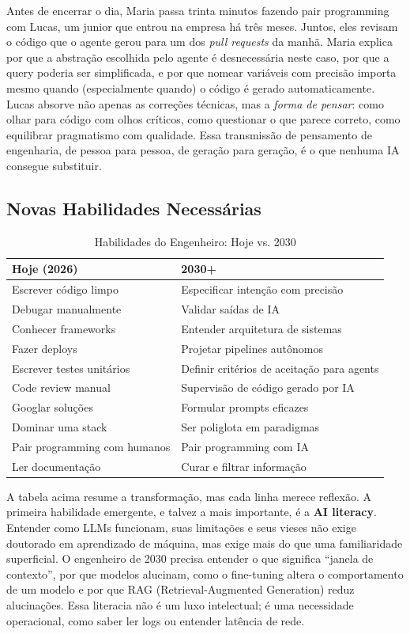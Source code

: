 Antes de encerrar o dia, Maria passa trinta minutos fazendo pair
programming com Lucas, um junior que entrou na empresa há três meses.
Juntos, eles revisam o código que o agente gerou para um dos
\textit{pull requests} da manhã. Maria explica por que a abstração
escolhida pelo agente é desnecessária neste caso, por que a query
poderia ser simplificada, e por que nomear variáveis com precisão
importa mesmo quando (especialmente quando) o código é gerado
automaticamente. Lucas absorve não apenas as correções técnicas, mas
a \textit{forma de pensar}: como olhar para código com olhos críticos,
como questionar o que parece correto, como equilibrar pragmatismo com
qualidade. Essa transmissão de pensamento de engenharia, de pessoa
para pessoa, de geração para geração, é o que nenhuma IA consegue
substituir.

\subsection{Novas Habilidades Necessárias}

\begin{table}[h]
\centering
\caption{Habilidades do Engenheiro: Hoje vs. 2030}
\begin{tabular}{p{5.5cm} p{5.5cm}}
\toprule
\textbf{Hoje (2026)} & \textbf{2030+} \\
\midrule
Escrever código limpo & Especificar intenção com precisão \\
Debugar manualmente & Validar saídas de IA \\
Conhecer frameworks & Entender arquitetura de sistemas \\
Fazer deploys & Projetar pipelines autônomos \\
Escrever testes unitários & Definir critérios de aceitação para agents \\
Code review manual & Supervisão de código gerado por IA \\
Googlar soluções & Formular prompts eficazes \\
Dominar uma stack & Ser poliglota em paradigmas \\
Pair programming com humanos & Pair programming com IA \\
Ler documentação & Curar e filtrar informação \\
\bottomrule
\end{tabular}
\end{table}

A tabela acima resume a transformação, mas cada linha merece reflexão. A primeira habilidade emergente, e talvez a mais importante, é a \textbf{AI literacy}. Entender como LLMs funcionam, suas limitações e seus vieses não exige doutorado em aprendizado de máquina, mas exige mais do que uma familiaridade superficial. O engenheiro de 2030 precisa entender o que significa ``janela de contexto'', por que modelos alucinam, como o fine-tuning altera o comportamento de um modelo e por que RAG (Retrieval-Augmented Generation) reduz alucinações. Essa literacia não é um luxo intelectual; é uma necessidade operacional, como saber ler logs ou entender latência de rede.

